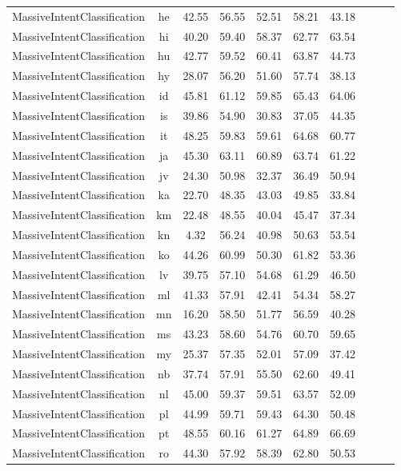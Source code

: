 \documentclass[11pt]{article}
\begin{document}
\begin{table*}[t!]
{\begin{tabular}{lc|cccccccc}
MassiveIntentClassification & he & 42.55 & 56.55 & 52.51 & 58.21 & 43.18 \\
MassiveIntentClassification & hi & 40.20 & 59.40 & 58.37 & 62.77 & 63.54 \\
MassiveIntentClassification & hu & 42.77 & 59.52 & 60.41 & 63.87 & 44.73 \\
MassiveIntentClassification & hy & 28.07 & 56.20 & 51.60 & 57.74 & 38.13 \\
MassiveIntentClassification & id & 45.81 & 61.12 & 59.85 & 65.43 & 64.06 \\
MassiveIntentClassification & is & 39.86 & 54.90 & 30.83 & 37.05 & 44.35 \\
MassiveIntentClassification & it & 48.25 & 59.83 & 59.61 & 64.68 & 60.77 \\
MassiveIntentClassification & ja & 45.30 & 63.11 & 60.89 & 63.74 & 61.22 \\
MassiveIntentClassification & jv & 24.30 & 50.98 & 32.37 & 36.49 & 50.94 \\
MassiveIntentClassification & ka & 22.70 & 48.35 & 43.03 & 49.85 & 33.84 \\
MassiveIntentClassification & km & 22.48 & 48.55 & 40.04 & 45.47 & 37.34 \\
MassiveIntentClassification & kn & 4.32 & 56.24 & 40.98 & 50.63 & 53.54 \\
MassiveIntentClassification & ko & 44.26 & 60.99 & 50.30 & 61.82 & 53.36 \\
MassiveIntentClassification & lv & 39.75 & 57.10 & 54.68 & 61.29 & 46.50 \\
MassiveIntentClassification & ml & 41.33 & 57.91 & 42.41 & 54.34 & 58.27 \\
MassiveIntentClassification & mn & 16.20 & 58.50 & 51.77 & 56.59 & 40.28 \\
MassiveIntentClassification & ms & 43.23 & 58.60 & 54.76 & 60.70 & 59.65 \\
MassiveIntentClassification & my & 25.37 & 57.35 & 52.01 & 57.09 & 37.42 \\
MassiveIntentClassification & nb & 37.74 & 57.91 & 55.50 & 62.60 & 49.41 \\
MassiveIntentClassification & nl & 45.00 & 59.37 & 59.51 & 63.57 & 52.09 \\
MassiveIntentClassification & pl & 44.99 & 59.71 & 59.43 & 64.30 & 50.48 \\
MassiveIntentClassification & pt & 48.55 & 60.16 & 61.27 & 64.89 & 66.69 \\
MassiveIntentClassification & ro & 44.30 & 57.92 & 58.39 & 62.80 & 50.53 \\

\end{tabular}}
\end{table*}
\end{document}
